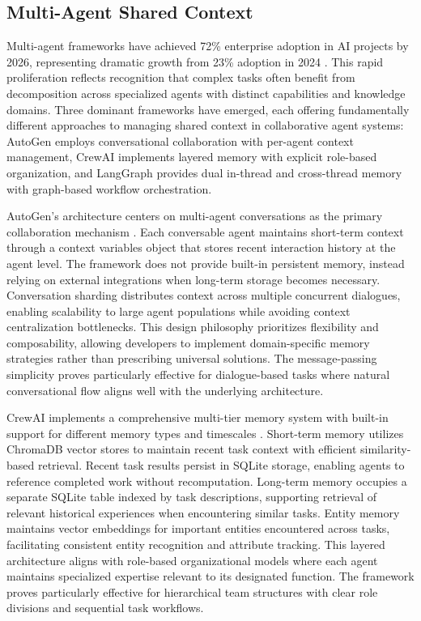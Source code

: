 \subsection{Multi-Agent Shared Context}

Multi-agent frameworks have achieved 72\% enterprise adoption in AI projects by 2026, representing dramatic growth from 23\% adoption in 2024 \citep{amplework2024comparison}. This rapid proliferation reflects recognition that complex tasks often benefit from decomposition across specialized agents with distinct capabilities and knowledge domains. Three dominant frameworks have emerged, each offering fundamentally different approaches to managing shared context in collaborative agent systems: AutoGen employs conversational collaboration with per-agent context management, CrewAI implements layered memory with explicit role-based organization, and LangGraph provides dual in-thread and cross-thread memory with graph-based workflow orchestration.

AutoGen's architecture centers on multi-agent conversations as the primary collaboration mechanism \citep{wu2023autogen}. Each conversable agent maintains short-term context through a context variables object that stores recent interaction history at the agent level. The framework does not provide built-in persistent memory, instead relying on external integrations when long-term storage becomes necessary. Conversation sharding distributes context across multiple concurrent dialogues, enabling scalability to large agent populations while avoiding context centralization bottlenecks. This design philosophy prioritizes flexibility and composability, allowing developers to implement domain-specific memory strategies rather than prescribing universal solutions. The message-passing simplicity proves particularly effective for dialogue-based tasks where natural conversational flow aligns well with the underlying architecture.

CrewAI implements a comprehensive multi-tier memory system with built-in support for different memory types and timescales \citep{datacamp2024comparison}. Short-term memory utilizes ChromaDB vector stores to maintain recent task context with efficient similarity-based retrieval. Recent task results persist in SQLite storage, enabling agents to reference completed work without recomputation. Long-term memory occupies a separate SQLite table indexed by task descriptions, supporting retrieval of relevant historical experiences when encountering similar tasks. Entity memory maintains vector embeddings for important entities encountered across tasks, facilitating consistent entity recognition and attribute tracking. This layered architecture aligns with role-based organizational models where each agent maintains specialized expertise relevant to its designated function. The framework proves particularly effective for hierarchical team structures with clear role divisions and sequential task workflows.

